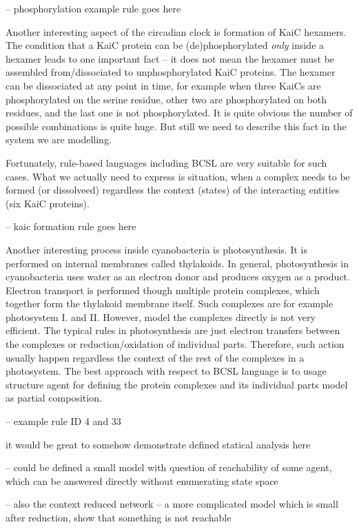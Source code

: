 \documentclass[12pt]{fithesis2}
\begin{document}
-- phosphorylation example rule goes here

Another interesting aspect of the circadian clock is formation of KaiC hexamers. The condition that a KaiC protein can be (de)phosphorylated \emph{only} inside a hexamer leads to one important fact -- it does not mean the hexamer must be assembled from/dissociated to unphosphorylated KaiC proteins. The hexamer can be dissociated at any point in time, for example when three KaiCs are phosphorylated on the serine residue, other two are phosphorylated on both residues, and the last one is not phosphorylated. It is quite obvious the number of possible combinations is quite huge. But still we need to describe this fact in the system we are modelling.

Fortunately, rule-based languages including BCSL are very suitable for such cases. What we actually need to express is situation, when a complex needs to be formed (or dissolveed) regardless the context (states) of the interacting entities (six KaiC proteins).

-- kaic formation rule goes here

Another interesting process inside cyanobacteria is photosynthesis. It is performed on internal membranes called thylakoids. In general, photosynthesis in cyanobacteria uses water as an electron donor and produces oxygen as a product. Electron transport is performed though multiple protein complexes, which together form the thylakoid membrane itself. Such complexes are for example photosystem I. and II. However, model the complexes directly is not very efficient. The typical rules in photosynthesis are just electron transfers between the complexes or reduction/oxidation of individual parts. Therefore, such action usually happen regardless the context of the rest of the complexes in a photosystem. The best approach with respect to BCSL language is to usage structure agent for defining the protein complexes and its individual parts model as partial composition.

-- example rule ID 4 and 33 

it would be great to somehow demonstrate defined statical analysis here

-- could be defined a small model with question of reachability of some agent, which can be answered directly without enumerating state space

-- also the context reduced network -- a more complicated model which is small after reduction, show that something is not reachable
\end{document}
